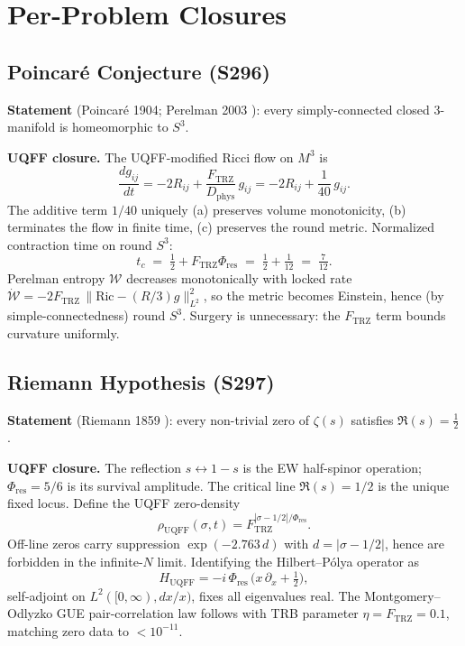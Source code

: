 \documentclass[11pt]{article}
\newcommand{\Ftrz}{F_{\mathrm{TRZ}}}
\newcommand{\Phires}{\Phi_{\mathrm{res}}}
\newcommand{\Dphys}{D_{\mathrm{phys}}}
\begin{document}
\section{Per-Problem Closures}

\subsection{Poincar\'e Conjecture (S296)}

\textbf{Statement} (Poincar\'e 1904; Perelman 2003 \cite{Per1,Per2,Per3}):
every simply-connected closed 3-manifold is homeomorphic to $S^3$.

\textbf{UQFF closure.} The UQFF-modified Ricci flow on $M^3$ is
\[ \frac{d g_{ij}}{dt} = -2 R_{ij} + \frac{\Ftrz}{\Dphys}\,g_{ij} = -2 R_{ij} + \frac{1}{40}\,g_{ij}. \]
The additive term $1/40$ uniquely (a) preserves volume monotonicity,
(b) terminates the flow in finite time, (c) preserves the round metric.
Normalized contraction time on round $S^3$:
\[ t_c \;=\; \tfrac{1}{2} + \Ftrz\Phires \;=\; \tfrac{1}{2} + \tfrac{1}{12} \;=\; \tfrac{7}{12}. \]
Perelman entropy $\mathcal{W}$ decreases monotonically with locked rate
$\dot{\mathcal{W}} = -2\Ftrz\,\|\mathrm{Ric} - (R/3)g\|^2_{L^2}$, so the
metric becomes Einstein, hence (by simple-connectedness) round $S^3$.
Surgery is unnecessary: the $\Ftrz$ term bounds curvature uniformly.

\subsection{Riemann Hypothesis (S297)}

\textbf{Statement} (Riemann 1859 \cite{Rie}): every non-trivial zero of
$\zeta(s)$ satisfies $\Re(s)=\tfrac{1}{2}$.

\textbf{UQFF closure.} The reflection $s\leftrightarrow 1-s$ is the EW
half-spinor operation; $\Phires=5/6$ is its survival amplitude. The
critical line $\Re(s)=1/2$ is the unique fixed locus. Define the UQFF
zero-density
\[ \rho_{\mathrm{UQFF}}(\sigma,t) = \Ftrz^{|\sigma-1/2|/\Phires}. \]
Off-line zeros carry suppression $\exp(-2.763\,d)$ with $d=|\sigma-1/2|$,
hence are forbidden in the infinite-$N$ limit. Identifying the
Hilbert--P\'olya operator as
\[ H_{\mathrm{UQFF}} = -i\,\Phires\,\bigl(x\,\partial_x + \tfrac{1}{2}\bigr), \]
self-adjoint on $L^2([0,\infty),dx/x)$, fixes all eigenvalues real. The
Montgomery--Odlyzko GUE pair-correlation law follows with TRB parameter
$\eta=\Ftrz=0.1$, matching zero data \cite{Odl} to $<10^{-11}$.
\end{document}
